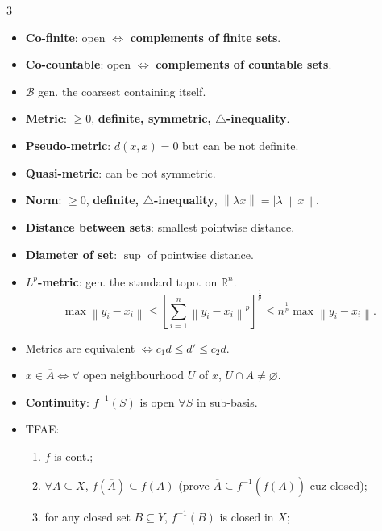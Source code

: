 \documentclass[10pt]{article}
\newcommand{\R}{\mathbb{R}} %
\newcommand{\abs}[1]{\left\lvert#1\right\rvert} %
\newcommand{\norm}[1]{\left\lVert#1\right\rVert} %
\begin{document}
    \begin{multicols*}{3}
        \begin{itemize}
            \setlength\itemsep{0.11em}
            \item \textbf{Co-finite}: open $\iff$ \textbf{complements of finite sets}.
            \item \textbf{Co-countable}: open $\iff$ \textbf{complements of countable sets}.
            \item $\mathcal{B}$ gen. the coarsest containing itself.
            \item \textbf{Metric}:  $\geq 0$, \textbf{definite, symmetric, $\triangle$-inequality}.
            \item \textbf{Pseudo-metric}: $d\left(x, x\right) = 0$ but can be not definite.
            \item \textbf{Quasi-metric}: can be not symmetric.
            \item \textbf{Norm}: $\geq 0$, \textbf{definite, $\triangle$-inequality}, $\norm{\lambda x} = \abs{\lambda}\norm{x}$.
            \item \textbf{Distance between sets}: smallest pointwise distance.
            \item \textbf{Diameter of set}: $\sup$ of pointwise distance.
            \item $L^p$\textbf{-metric}: gen. the standard topo. on $\R^n$.
            \begin{equation*}
                \max\norm{y_i - x_i} \leq \left[\sum_{i = 1}^{n}\norm{y_i - x_i}^p\right]^{\frac{1}{p}} \leq n^{\frac{1}{p}}\max\norm{y_i - x_i}.
            \end{equation*}
            \item Metrics are equivalent $\iff c_1d \leq d' \leq c_2d$.
            \item $x \in \overline{A} \iff \forall$ open neighbourhood $U$ of $x$, $U \cap A \neq \varnothing$.
            \item \textbf{Continuity}: $f^{-1}\left(S\right)$ is open $\forall S$ in sub-basis.
            \item TFAE:
            \begin{enumerate}
                \item $f$ is cont.;
                \item $\forall A \subseteq X$, $f\left(\overline{A}\right) \subseteq \overline{f\left(A\right)}$ (prove $\overline{A} \subseteq f^{-1}\left(\overline{f\left(A\right)}\right)$ cuz closed);
                \item for any closed set $B \subseteq Y$, $f^{-1}\left(B\right)$ is closed in $X$;

\end{enumerate}
\end{itemize}
\end{multicols*}
\end{document}
